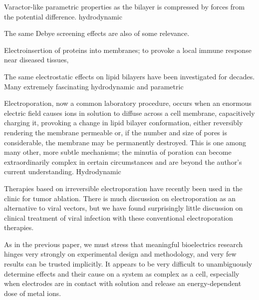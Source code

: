\documentclass[fleqn,10pt]{paper}
\begin{document}


Varactor-like parametric properties as the bilayer is compressed by forces from the potential difference. hydrodynamic

The same Debye screening effects are also of some relevance. 

Electroinsertion of proteins into membranes\cite{Clinical1996}; to provoke a local immune response near diseased tissues, 

The same electrostatic effects on lipid bilayers have been investigated for decades. Many extremely fascinating hydrodynamic and parametric 



Electroporation\cite{Electroporation1988}, now a common laboratory procedure, occurs when an enormous electric field causes ions in solution to diffuse across a cell membrane, capacitively charging it, provoking a change in lipid bilayer conformation\cite{Membrane2016}, either reversibly rendering the membrane permeable or, if the number and size of pores is considerable, the membrane may be permanently destroyed. This is one among many other, more subtle mechanisms; the minutia of poration can become extraordinarily complex in certain circumstances and are beyond the author's current understanding\cite{Theoretical2007}. Hydrodynamic

Therapies based on irreversible electroporation\cite{Nonthermal2013}\cite{Lipid2017} have recently been used in the clinic\cite{Irreversible2013} for tumor ablation. There is much discussion on electroporation as an alternative to viral vectors, but we have found surprisingly little discussion on clinical treatment of viral infection with these conventional electroporation therapies.

As in the previous paper, we must stress that meaningful bioelectrics research hinges very strongly on experimental design and methodology, and very few results can be trusted implicitly. It appears to be very difficult to unambiguously determine effects and their cause on a system as complex as a cell, especially when electrodes are in contact with solution and release an energy-dependent dose of metal ions.
\end{document}
